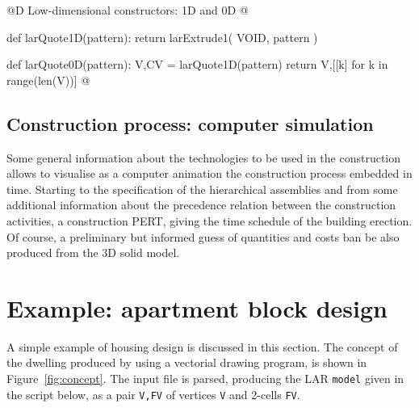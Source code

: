 \documentclass[11pt,oneside]{article}    %
\begin{document}
@D Low-dimensional constructors: 1D and 0D
@{
def larQuote1D(pattern):
    return larExtrude1( VOID, pattern )

def larQuote0D(pattern):
    V,CV = larQuote1D(pattern)
    return V,[[k] for k in range(len(V))] 
@}


\subsection{Construction process: computer simulation}
Some general information about the technologies to be used in the construction  allows to visualise as a computer animation the construction process embedded in time.
Starting to the specification of the hierarchical assemblies and from some additional information about the precedence relation between the construction activities, a construction PERT, giving the time schedule of the building erection. Of course, a preliminary but informed guess of quantities and costs ban be also produced from the 3D solid model. 


\section{Example: apartment block design}\label{sec:examples}

A simple example of housing design is discussed in this section.
The concept of the dwelling produced by using a vectorial drawing program, is shown in Figure~\ref{fig:concept}. The input file is parsed, producing the LAR \texttt{model} given in the script below, as a pair \texttt{V,FV} of vertices \texttt{V} and 2-cells \texttt{FV}.
\end{document}
